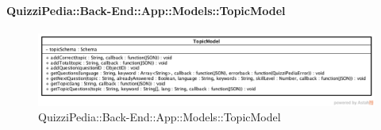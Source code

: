 \paragraph{QuizziPedia::Back-End::App::Models::TopicModel}
\label{QuizziPedia::Back-End::App::Models::TopicModel}
\begin{figure}[ht]
	\centering
	\includegraphics[scale=0.6]{UML/Classi/Back-End/QuizziPedia_Back-End_App_Models_topicModel.png}
	\caption{QuizziPedia::Back-End::App::Models::TopicModel}
\end{figure}
\FloatBarrier
